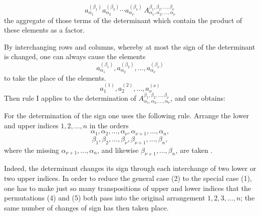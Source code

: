 
\begin{equation}
        a_{\alpha_1}^{(\beta_1)}a_{\alpha_2}^{(\beta_2)}\cdots a_{\alpha_\nu}^{(\beta_\nu)}\,
        A_{\alpha_1,\alpha_2,\ldots,\alpha_\nu}^{\beta_1,\beta_2,\ldots,\beta_\nu}
\tag{2}
\end{equation}
the aggregate of those terms of the determinant which contain the product of these elements as a factor.

By interchanging rows and columns, whereby at most the sign of the determinant is changed, one can always cause the elements
\begin{equation}
        a_{\alpha_1}^{(\beta_1)},
        a_{\alpha_2}^{(\beta_2)},\ldots,
        a_{\alpha_\nu}^{(\beta_\nu)}
\tag{3}
\end{equation}
to take the place of the elements. %
\[
        a_1^{(1)},a_2^{(2)},\ldots,a_\nu^{(\nu)}
\]
Then rule I applies to the determination of \(A_{\alpha_1,\alpha_2,\ldots,\alpha_\nu}^{\beta_1,\beta_2,\ldots,\beta_\nu}\), and one obtains:


For the determination of the sign one uses the following rule.  Arrange the lower and upper indices \(1,2,\ldots,n\) in the orders
\begin{equation}
        \alpha_1,\alpha_2,\ldots,\alpha_\nu,\alpha_{\nu+1},\ldots,\alpha_n,
\tag{4}
\end{equation}
\begin{equation}
        \beta_1,\beta_2,\ldots,\beta_\nu,\beta_{\nu+1},\ldots,\beta_n,
\tag{5}
\end{equation}
where the missing \(\alpha_{\nu+1},\ldots,\alpha_n\), and likewise \(\beta_{\nu+1},\ldots,\beta_n\), are taken .


Indeed, the determinant changes its sign through each interchange of two lower or two upper indices.  In order to reduce the general case (2) to the special case (1), one has to make just so many transpositions of upper and lower indices that the permutations (4) and (5) both pass into the original arrangement \(1,2,3,\ldots,n\); the same number of changes of sign has then taken place.
